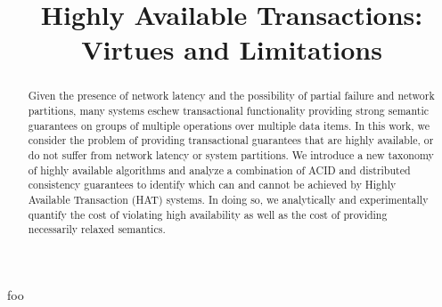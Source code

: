 \documentclass{vldb}
\begin{document}

\title{Highly Available Transactions: Virtues and Limitations}

\maketitle

\begin{abstract}
Given the presence of network latency and the possibility of partial
failure and network partitions, many systems eschew transactional
functionality providing strong semantic guarantees on groups of
multiple operations over multiple data items. In this work, we
consider the problem of providing transactional guarantees that are
highly available, or do not suffer from network latency or system
partitions.  We introduce a new taxonomy of highly available
algorithms and analyze a combination of ACID and distributed
consistency guarantees to identify which can and cannot be achieved by
Highly Available Transaction (HAT) systems. In doing so, we
analytically and experimentally quantify the cost of violating high
availability as well as the cost of providing necessarily relaxed
semantics.
\end{abstract}


















foo~\cite{adya}


\footnotesize
  



\end{document}
